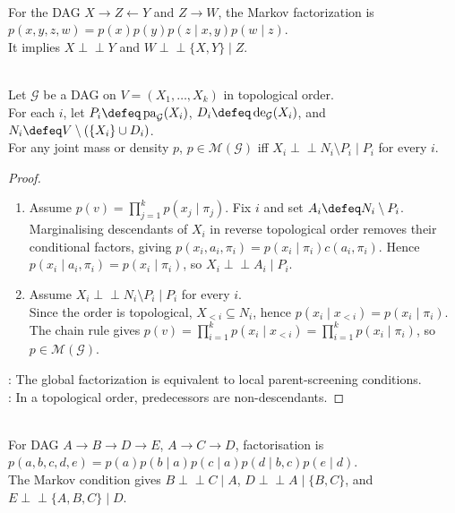 \begin{example} \label{ex:dag-factorization-v-structure-tail} \\
For the DAG $X\to Z\leftarrow Y$ and $Z\to W$, the Markov factorization is $p(x,y,z,w)=p(x)p(y)p(z\mid x,y)p(w\mid z)$.\\
It implies $X\perp\!\!\!\perp Y$ and $W\perp\!\!\!\perp\{X,Y\}\mid Z$.
\end{example}

\begin{theorem} \label{thm:dag-markov-condition} \\
Let $\mathcal{G}$ be a DAG on $V=(X_1,\ldots,X_k)$ in topological order.\\
For each $i$, let $P_i\defeq\operatorname{pa}_{\mathcal{G}}(X_i)$, $D_i\defeq\operatorname{de}_{\mathcal{G}}(X_i)$, and $N_i\defeq V\setminus(\{X_i\}\cup D_i)$.\\
For any joint mass or density $p$, $p\in\mathcal{M}(\mathcal{G})$ iff $X_i\perp\!\!\!\perp N_i\setminus P_i\mid P_i$ for every $i$.
\begin{proof}
\begin{enumerate}[label=\roman*.]
\setlength{\itemsep}{0pt}
\item[$(\Rightarrow)$] Assume $p(v)=\prod_{j=1}^{k}p(x_j\mid\pi_j)$. Fix $i$ and set $A_i\defeq N_i\setminus P_i$.\\
Marginalising descendants of $X_i$ in reverse topological order removes their conditional factors, giving $p(x_i,a_i,\pi_i)=p(x_i\mid\pi_i)c(a_i,\pi_i)$. Hence $p(x_i\mid a_i,\pi_i)=p(x_i\mid\pi_i)$, so $X_i\perp\!\!\!\perp A_i\mid P_i$.
\item[$(\Leftarrow)$] Assume $X_i\perp\!\!\!\perp N_i\setminus P_i\mid P_i$ for every $i$.\\
Since the order is topological, $X_{<i}\subseteq N_i$, hence $p(x_i\mid x_{<i})=p(x_i\mid\pi_i)$.\\
The chain rule gives $p(v)=\prod_{i=1}^{k}p(x_i\mid x_{<i})=\prod_{i=1}^{k}p(x_i\mid\pi_i)$, so $p\in\mathcal{M}(\mathcal{G})$.
\end{enumerate}
: The global factorization is equivalent to local parent-screening conditions.\\
: In a topological order, predecessors are non-descendants.
\end{proof}
\end{theorem}

\begin{example} \label{ex:five-node-markov-condition} \\
For DAG $A\to B\to D\to E$, $A\to C\to D$, factorisation is $p(a,b,c,d,e)=p(a)p(b\mid a)p(c\mid a)p(d\mid b,c)p(e\mid d)$.\\
The Markov condition gives $B\perp\!\!\!\perp C\mid A$, $D\perp\!\!\!\perp A\mid\{B,C\}$, and $E\perp\!\!\!\perp\{A,B,C\}\mid D$.
\end{example}

